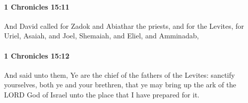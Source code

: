 		\paragraph{1 Chronicles 15:11} %
			\label{1CHRONICLES-15-11}

			And David called for Zadok and Abiathar the priests, and for the Levites, for Uriel, Asaiah, and Joel, Shemaiah, and Eliel, and Amminadab,


		\paragraph{1 Chronicles 15:12} %
			\label{1CHRONICLES-15-12}

			And said unto them, Ye are the chief of the fathers of the Levites: sanctify yourselves, both ye and your brethren, that ye may bring up the ark of the LORD God of Israel unto the place that I have prepared for it.

